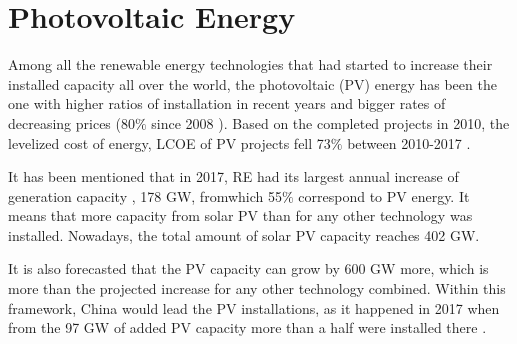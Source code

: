 

 
\section{Photovoltaic Energy}

Among all the renewable energy technologies that had started to increase their installed capacity all over the world, the photovoltaic (PV) energy has been the one with higher ratios of installation in recent years and bigger rates of decreasing prices (80$\%$ since 2008 \cite*{IRENA2017}). Based on the completed projects in 2010, the levelized cost of energy, LCOE of PV projects fell 73$\%$ between 2010-2017 \cite*{REN21}.


It has been mentioned that in 2017, RE had its largest annual increase of generation capacity \cite*{REN21}, 178 GW, fromwhich 55$\%$ correspond to PV energy. It means that more capacity from solar PV than for any other technology was installed. Nowadays, the total amount of solar PV capacity reaches 402 GW.

It is also forecasted that the PV capacity can grow by 600 GW more, which is more than the projected increase for any other technology combined. Within this framework, China would lead the PV installations, as it happened in 2017 when from the 97 GW of added PV capacity more than a half were installed there \cite*{REN21}. 


